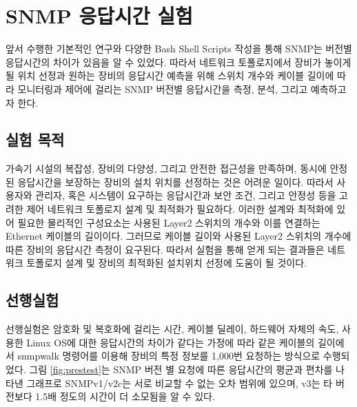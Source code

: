\documentclass[11pt
  , a4paper
  , article
  , oneside
]{memoir}
\begin{document}
\clearpage

\chapter{SNMP 응답시간 실험}
앞서 수행한 기본적인 연구와 다양한 Bash Shell Scripts 작성을 통해 SNMP는 버전별 응답시간의 차이가 있음을 알 수 있었다. 따라서 네트워크 토폴로지에서 장비가 놓이게 될 위치 선정과 원하는 장비의 응답시간 예측을 위해 스위치 개수와 케이블 길이에 따라 모니터링과 제어에 걸리는 SNMP 버전별 응답시간을 측정, 분석, 그리고 예측하고자 한다.

\section{실험 목적}
가속기 시설의 복잡성, 장비의 다양성, 그리고 안전한 접근성을 만족하며, 동시에 안정된 응답시간을 보장하는 장비의 설치 위치를 선정하는 것은 어려운 일이다. 따라서 사용자와 관리자, 혹은 시스템이 요구하는 응답시간과 보안 조건, 그리고 안정성 등을 고려한 제어 네트워크 토폴로지 설계 및 최적화가 필요하다. 이러한 설계와 최적화에 있어 필요한 물리적인 구성요소는 사용된 Layer2 스위치의 개수와 이를 연결하는 Ethernet 케이블의 길이이다. 그러므로 케이블 길이와 사용된 Layer2 스위치의 개수에 따른 장비의 응답시간 측정이 요구된다. 따라서 실험을 통해 얻게 되는 결과들은 네트워크 토폴로지 설계 및 장비의 최적화된 설치위치 선정에 도움이 될 것이다.

\section{선행실험}
선행실험은 암호화 및 복호화에 걸리는 시간, 케이블 딜레이, 하드웨어 자체의 속도, 사용한 Linux OS에 대한 응답시간의 차이가 같다는 가정에 따라 같은 케이블의 길이에서 snmpwalk 명령어를 이용해 장비의 특정 정보를 1,000번 요청하는 방식으로 수행되었다. 그림 \ref{fig:prestest}는 SNMP 버전 별 요청에 따른 응답시간의 평균과 편차를 나타낸 그래프로 SNMPv1/v2c는 서로 비교할 수 없는 오차 범위에 있으며, v3는 타 버전보다 1.5배 정도의 시간이 더 소모됨을 알 수 있다. 
\end{document}
